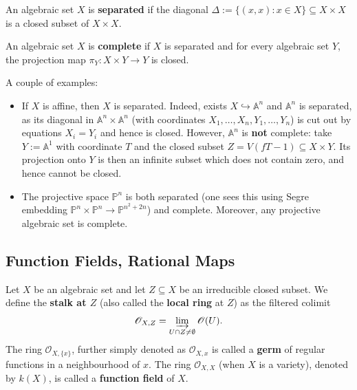 \documentclass{template}
\begin{document}
\begin{definition}
    An algebraic set $X$ is \textbf{separated} if the diagonal $\Delta := \{(x,x): x \in X\} \subseteq X \times X$
    is a closed subset of $X \times X$.
\end{definition}

\begin{definition}
    An algebraic set $X$ is \textbf{complete} if $X$ is separated and for every 
    algebraic set $Y$, the projection map $\pi_Y: X \times Y \to Y$ is closed.
\end{definition}

\begin{example}
    A couple of examples:
    \begin{itemize}
        \item If $X$ is affine, then $X$ is separated. Indeed, exists $X \hookrightarrow \mathbb{A}^n$
        and $\mathbb{A}^n$ is separated, as its diagonal in $\mathbb{A}^n \times \mathbb{A}^n$ (with coordinates $X_1,\dots,X_n,Y_1,\dots,Y_n$)
        is cut out by equations $X_i=Y_i$ and hence is closed. However, $\mathbb{A}^n$ is \textbf{not} 
        complete: take $Y := \mathbb{A}^1$ with coordinate $T$ and the closed subset $Z=V(fT-1) \subseteq X \times Y$.
        Its projection onto $Y$ is then an infinite subset which does not contain zero, and 
        hence cannot be closed.
        \item The projective space $\mathbb{P}^n$ is both separated (one sees this using 
        Segre embedding $\mathbb{P}^n \times \mathbb{P}^n \to \mathbb{P}^{n^2+2n}$) and 
        complete. Moreover, any projective algebraic set is complete.
    \end{itemize}
\end{example}

\subsection{Function Fields, Rational Maps}

\begin{definition}
    Let $X$ be an algebraic set and let $Z \subseteq X$ be an irreducible closed 
    subset. We define the \textbf{stalk at $Z$} (also called the \textbf{local ring} at $Z$)
    as the filtered colimit
    \begin{equation*}
        \mathcal{O}_{X,Z} = \varinjlim_{U \cap Z \neq \emptyset} \mathcal{O}(U).
    \end{equation*}
    The ring $\mathcal{O}_{X,\{x\}}$, further simply denoted as $\mathcal{O}_{X,x}$ is 
    called a \textbf{germ} of regular functions in a neighbourhood of $x$. 
    The ring $\mathcal{O}_{X,X}$ (when $X$ is a variety), denoted by $k(X)$,
    is called a \textbf{function field} of $X$.  
\end{definition}
\end{document}
